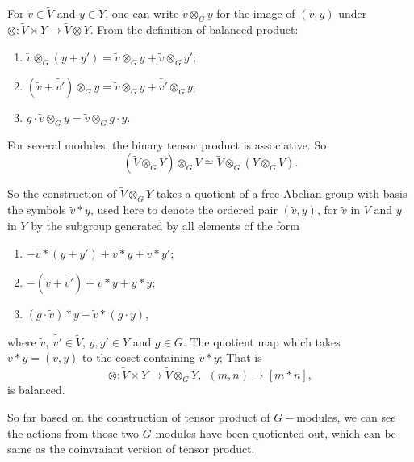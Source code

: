 \documentclass[12pt,a4paper,english]{article}
\theoremstyle{plain}
\theoremstyle{definition}
\begin{document}
For $\widetilde{v}\in \widetilde{V}$ and $y\in Y$, one can write $\widetilde{v}\otimes_{G} y$ for the image of $(\widetilde{v},y)$ under $\otimes: \widetilde{V}\times Y\rightarrow \widetilde{V}\otimes Y$. From the definition of balanced product:
\begin{enumerate}
    \item $\widetilde{v}\otimes_{G} (y+y')=\widetilde{v}\otimes_{G} y+\widetilde{v}\otimes_{G} y'$;
    \item $(\widetilde{v}+\widetilde{v'})\otimes_{G} y=\widetilde{v}\otimes_{G} y +\widetilde{v'}\otimes_{G} y$;
    \item $g\cdot\widetilde{v}\otimes_{G} y=\widetilde{v}\otimes_{G} g\cdot y$.
\end{enumerate}

For several modules, the binary tensor product is associative. So 
\begin{equation*}
    (\widetilde{V}\otimes_{G}Y)\otimes_{G}V\cong \widetilde{V}\otimes_{G}(Y\otimes_{G} V).
\end{equation*}

So the construction of $\widetilde{V}\otimes_{G}Y$ takes a quotient of a free Abelian group with basis the symbols $\widetilde{v}*y$, used here to denote the ordered pair $(\widetilde{v}, y)$, for $\widetilde{v}$ in $\widetilde{V}$ and $y$ in $Y$ by the subgroup generated by all elements of the form
\begin{enumerate}
    \item $-\widetilde{v}*(y+y')+\widetilde{v}*y+\widetilde{v}*y'$;
    \item 
    $-(\widetilde{v}+\widetilde{v'})+\widetilde{v}*y+\widetilde{y}*y$;
    \item $(g\cdot \widetilde{v})*y-\widetilde{
    v}*(g\cdot y)$,
\end{enumerate}
where $\widetilde{v},\ \widetilde{v'}\in \widetilde{V}$, $y,y'\in Y$ and $g\in G$. The quotient map which takes $\widetilde{v}*y=(\widetilde{v}, y)$ to the coset containing $\widetilde{v}*y$; That is 
\begin{equation*}
    \otimes : \widetilde{V}\times Y\rightarrow \widetilde{V}\otimes_{G} Y,\ \ (m,n )\rightarrow [m*n], 
\end{equation*}
is balanced.

So far based on the construction of tensor product of $G-$modules, we can see the actions from those two $G$-modules have been quotiented out, which can be same as the coinvraiant version of tensor product.
\end{document}

